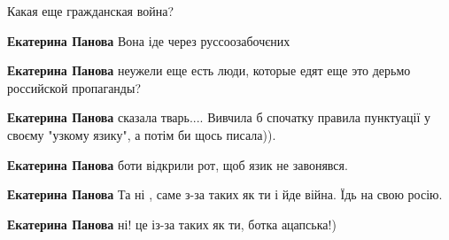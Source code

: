 \begin{itemize}
\begin{itemize}
Какая еще гражданская война?

 
\textbf{Екатерина Панова} Вона іде через руссоозабочєних

 
\textbf{Екатерина Панова} неужели еще есть люди, которые едят еще это дерьмо российской пропаганды?

 
\textbf{Екатерина Панова} сказала тварь....
Вивчила б спочатку правила пунктуації у своєму "узкому язику", а потім би щось писала)).

 
\textbf{Екатерина Панова} боти відкрили рот, щоб язик не завонявся.

 
\textbf{Екатерина Панова} Та ні , саме з-за таких як ти і йде війна. Їдь на свою росію.

 
\textbf{Екатерина Панова} ні! це із-за таких як ти, ботка ацапська!)


\end{itemize}
\end{itemize}
